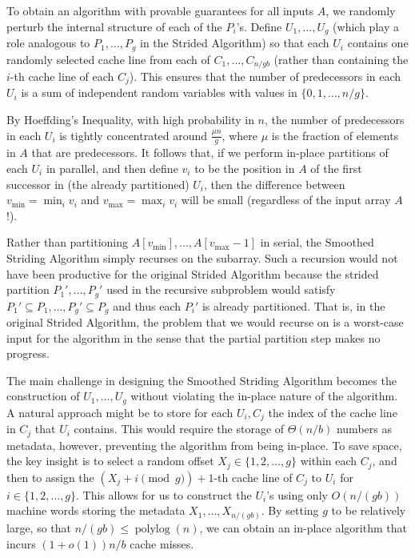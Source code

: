 \documentclass[twoside,leqno,twocolumn]{article}
\newcommand{\polylog}{\operatorname{polylog}}
\renewcommand{\paragraph}[1]{\vspace{0.09in}\noindent{\bf \boldmath #1.}}
\begin{document}

\paragraph{The Smoothed Striding Algorithm}
To obtain an algorithm with provable guarantees for all inputs $A$, we
randomly perturb the internal structure of each of the $P_i$'s. Define
$U_1, \ldots, U_{g}$ (which play a role analogous to $P_1,
\ldots, P_g$ in the Strided Algorithm) so that each $U_i$ contains one
randomly selected cache line from each of $C_1, \ldots, C_{n /
  gb}$ (rather than containing the $i$-th cache line of each
$C_j$). This ensures that the number of predecessors in each $U_i$ is
a sum of independent random variables with values in $\{0, 1, \ldots,
n/g\}$.

By Hoeffding's Inequality, with high probability in $n$, the number of
predecessors in each $U_i$ is tightly concentrated around $\frac{\mu
  n}{g}$, where $\mu$ is the fraction of elements in $A$ that are
predecessors. It follows that, if we perform in-place partitions of
each $U_i$ in parallel, and then define $v_i$ to be the position in
$A$ of the first successor in (the already partitioned) $U_i$, then
the difference between $v_{\text{min}} = \min_i v_i$ and
$v_{\text{max}} = \max_i v_i$ will be small (regardless of the input array
$A$!).

Rather than partitioning $A[v_{\text{min}}],\ldots,
A[v_{\text{max}}-1]$ in serial, the Smoothed Striding Algorithm simply
recurses on the subarray. Such a recursion would not have been
productive for the original Strided Algorithm because the strided
partition $P_1', \ldots, P_g'$ used in the recursive subproblem would
satisfy $P_1' \subseteq P_1, \ldots, P_g' \subseteq P_g$ and thus each
$P_i'$ is already partitioned. That is, in the original Strided
Algorithm, the problem that we would recurse on is a worst-case input
for the algorithm in the sense that the partial partition step makes
no progress.

The main challenge in designing the Smoothed Striding Algorithm
becomes the construction of $U_1, \ldots, U_{g}$ without
violating the in-place nature of the algorithm. A natural approach
might be to store for each $U_i, C_j$ the index of the cache
line in $C_j$ that $U_i$ contains. This would require the storage of
$\Theta(n / b)$ numbers as metadata, however, preventing the algorithm
from being in-place. To save space, the key insight is to select a
random offset $X_j \in \{1, 2, \ldots, g\}$ within each $C_j$, and
then to assign the $(X_j + i \pmod g) + 1$-th cache line of $C_j$ to
$U_i$ for $i \in \{1, 2, \ldots, g\}$. This allows for us to construct
the $U_i$'s using only $O(n/(gb))$ machine words
storing the metadata $X_1, \ldots, X_{n / (gb)}$. By setting $g$ to
be relatively large, so that $n/(gb) \le \polylog(n)$, we can obtain an in-place algorithm that
incurs $(1 + o(1))n/b$ cache misses.
\end{document}
